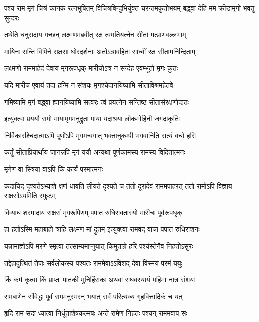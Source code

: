 \threelineshloka
{पश्य राम मृगं चित्रं कानकं रत्नभूषितम्}
{विचित्रबिन्दुभिर्युक्तं चरन्तमकुतोभयम्}
{बद्\mbox{}ध्वा देहि मम क्रीडामृगो भवतु सुन्दरः} %

\twolineshloka
{तथेति धनुरादाय गच्छन् लक्ष्मणमब्रवीत्}
{रक्ष त्वमतियत्नेन सीतां मत्प्राणवल्लभाम्} %

\twolineshloka
{मायिनः सन्ति विपिने राक्षसा घोरदर्शनाः}
{अतोऽत्रावहितः साध्वीं रक्ष सीतामनिन्दिताम्} %

\twolineshloka
{लक्ष्मणो राममाहेदं देवायं मृगरूपधृक्}
{मारीचोऽत्र न सन्देह एवम्भूतो मृगः कुतः} %


\twolineshloka
{यदि मारीच एवायं तदा हन्मि न संशयः}
{मृगश्चेदानयिष्यामि सीताविश्रमहेतवे} %

\twolineshloka
{गमिष्यामि मृगं बद्\mbox{}ध्वा ह्यानयिष्यामि सत्वरः}
{त्वं प्रयत्नेन सन्तिष्ठ सीतासंरक्षणोद्यतः} %

\twolineshloka
{इत्युक्त्वा प्रययौ रामो मायामृगमनुद्रुतः}
{माया यदाश्रया लोकमोहिनी जगदाकृतिः} %

\twolineshloka
{निर्विकारश्चिदात्माऽपि पूर्णोऽपि मृगमन्वगात्}
{भक्तानुकम्पी भगवानिति सत्यं वचो हरिः} %

\twolineshloka
{कर्तुं सीताप्रियार्थाय जानन्नपि मृगं ययौ}
{अन्यथा पूर्णकामस्य रामस्य विदितात्मनः} %

\onelineshloka
{मृगेण वा स्त्रिया वाऽपि किं कार्यं परमात्मनः} %


\threelineshloka
{कदाचिद् दृश्यतेऽभ्याशे क्षणं धावति लीयते}
{दृश्यते च ततो दूरादेवं राममपाहरत्}
{ततो रामोऽपि विज्ञाय राक्षसोऽयमिति स्फुटम्} %

\twolineshloka
{विव्याध शरमादाय राक्षसं मृगरूपिणम्}
{पपात रुधिराक्तास्यो मारीचः पूर्वरूपधृक्} %

\twolineshloka
{हा हतोऽस्मि महाबाहो त्राहि लक्ष्मण मां द्रुतम्}
{इत्युक्त्वा रामवद् वाचा पपात रुधिराशनः} %

\twolineshloka
{यन्नामाज्ञोऽपि मरणे स्मृत्वा तत्साम्यमाप्नुयात्}
{किमुताग्रे हरिं पश्यंस्तेनैव निहतोऽसुरः} %

\twolineshloka
{तद्देहादुत्थितं तेजः सर्वलोकस्य पश्यतः}
{राममेवाऽऽविशद् देवा विस्मयं परमं ययुः} %

\twolineshloka
{किं कर्म कृत्वा किं प्राप्तः पातकी मुनिहिंसकः}
{अथवा राघवस्यायं महिमा नात्र संशयः} %

\twolineshloka
{रामबाणेन संविद्धः पूर्वं राममनुस्मरन्}
{भयात् सर्वं परित्यज्य गृहवित्तादिकं च यत्} %

\twolineshloka
{हृदि रामं सदा ध्यात्वा निर्धूताशेषकल्मषः}
{अन्ते रामेण निहतः पश्यन् राममवाप सः} %

